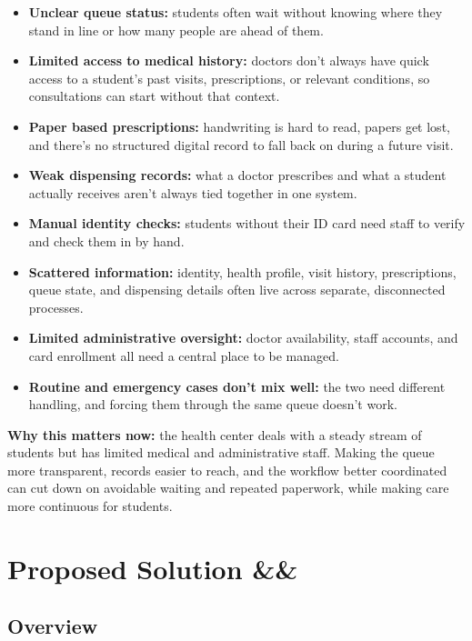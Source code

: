 \documentclass[11pt,a4paper]{article}
\newcommand{\BvrHint}[1]{%
  \ifx&#1&%
  \else
    {\normalfont\normalsize\itshape\hfill #1}%
  \fi}
\begin{document}
\begin{itemize}
    \item \textbf{Unclear queue status:} students often wait without knowing where they stand in line or how many people are ahead of them.
    \item \textbf{Limited access to medical history:} doctors don't always have quick access to a student's past visits, prescriptions, or relevant conditions, so consultations can start without that context.
    \item \textbf{Paper based prescriptions:} handwriting is hard to read, papers get lost, and there's no structured digital record to fall back on during a future visit.
    \item \textbf{Weak dispensing records:} what a doctor prescribes and what a student actually receives aren't always tied together in one system.
    \item \textbf{Manual identity checks:} students without their ID card need staff to verify and check them in by hand.
    \item \textbf{Scattered information:} identity, health profile, visit history, prescriptions, queue state, and dispensing details often live across separate, disconnected processes.
    \item \textbf{Limited administrative oversight:} doctor availability, staff accounts, and card enrollment all need a central place to be managed.
    \item \textbf{Routine and emergency cases don't mix well:} the two need different handling, and forcing them through the same queue doesn't work.
\end{itemize}

\textbf{Why this matters now:} the health center deals with a steady stream of students but has limited medical and administrative staff. Making the queue more transparent, records easier to reach, and the workflow better coordinated can cut down on avoidable waiting and repeated paperwork, while making care more continuous for students.


\section{Proposed Solution \BvrHint{}}

\subsection{Overview}
\end{document}
